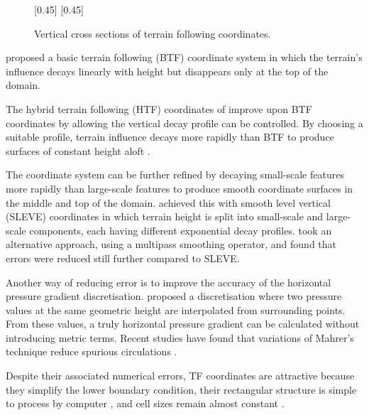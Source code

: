 \begin{figure}
	\captionsetup[subfigure]{position=b}
	\centering
	[0.45\textwidth]{}
	\hfill
	[0.45\textwidth]{}
	\caption{Vertical cross sections of terrain following coordinates.    }
	\label{fig:intro:tf}
\end{figure}

\textcite{galchen-somerville1975} proposed a basic terrain following (BTF) coordinate system in which the terrain's influence decays linearly with height but disappears only at the top of the domain.

The hybrid terrain following (HTF) coordinates of \textcite{simmons-burridge1981} improve upon BTF coordinates by allowing the vertical decay profile can be controlled.  By choosing a suitable profile, terrain influence decays more rapidly than BTF to produce surfaces of constant height aloft \autocite{klemp2011}.

The coordinate system can be further refined by decaying small-scale features more rapidly than large-scale features to produce smooth coordinate surfaces in the middle and top of the domain.  \textcite{schaer2002} achieved this with smooth level vertical (SLEVE) coordinates in which terrain height is split into small-scale and large-scale components, each having different exponential decay profiles.  \textcite{klemp2011} took an alternative approach, using a multipass smoothing operator, and found that errors were reduced still further compared to SLEVE.

Another way of reducing error is to improve the accuracy of the horizontal pressure gradient discretisation.  \textcite{mahrer1984} proposed a discretisation where two pressure values at the same geometric height are interpolated from surrounding points.  From these values, a truly horizontal pressure gradient can be calculated without introducing metric terms.  Recent studies have found that variations of Mahrer's technique reduce spurious circulations \parencites{dempsey-davis1998}{klemp2011}{zaengl2012}.


Despite their associated numerical errors, TF coordinates are attractive because they simplify the lower boundary condition, their rectangular structure is simple to process by computer \autocite{schaer2002}, and cell sizes remain almost constant \autocite{jebens2011}.

